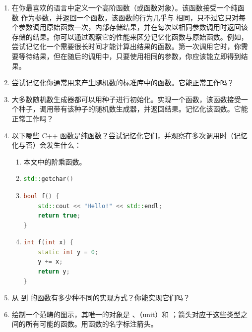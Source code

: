 \begin{enumerate}
  \tightlist
  \item
  在你最喜欢的语言中定义一个高阶函数（或函数对象）。该函数接受一个纯函数  作为参数，并返回一个函数，该函数的行为几乎与  相同，只不过它只对每个参数调用原始函数一次，内部存储结果，并在每次以相同参数调用时返回该存储的结果。你可以通过观察它的性能来区分记忆化函数与原始函数。例如，尝试记忆化一个需要很长时间才能计算出结果的函数。第一次调用它时，你需要等待结果，但在随后的调用中，只要使用相同的参数，你应该能立即得到结果。
  \item
  尝试记忆化你通常用来产生随机数的标准库中的函数。它能正常工作吗？
  \item
  大多数随机数生成器都可以用种子进行初始化。实现一个函数，该函数接受一个种子，调用带有该种子的随机数生成器，并返回结果。记忆化该函数。它能正常工作吗？
  \item
  以下哪些 C++ 函数是纯函数？尝试记忆化它们，并观察在多次调用时（记忆化与否）会发生什么：

  \begin{enumerate}
    \tightlist
    \item
    本文中的阶乘函数。
    \item
    \begin{lstlisting}[language=cpp]
std::getchar()
    \end{lstlisting}
    \item
    \begin{lstlisting}[language=cpp]
bool f() {
    std::cout << "Hello!" << std::endl;
    return true;
}
    \end{lstlisting}
    \item
    \begin{lstlisting}[language=cpp]
int f(int x) {
    static int y = 0;
    y += x;
    return y;
}
    \end{lstlisting}
  \end{enumerate}
  \item
  从  到  的函数有多少种不同的实现方式？你能实现它们吗？
  \item
  绘制一个范畴的图示，其唯一的对象是 、\code{()}（unit）和 ；箭头对应于这些类型之间的所有可能的函数。用函数的名字标注箭头。
\end{enumerate}
